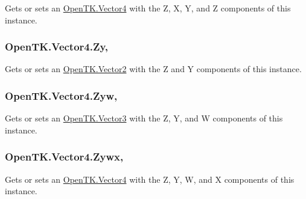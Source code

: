 Gets or sets an \hyperlink{struct_open_t_k_1_1_vector4}{Open\-T\-K.\-Vector4} with the Z, X, Y, and Z components of this instance. 

\hypertarget{struct_open_t_k_1_1_vector4_a6b251d1aabb60d339aca57817dfcf45e}{
\subsubsection[{Zy}]{ Open\-T\-K.\-Vector4.\-Zy\hspace{0.3cm}{\ttfamily [get]}, {\ttfamily [set]}}}\label{struct_open_t_k_1_1_vector4_a6b251d1aabb60d339aca57817dfcf45e}


Gets or sets an \hyperlink{struct_open_t_k_1_1_vector2}{Open\-T\-K.\-Vector2} with the Z and Y components of this instance. 

\hypertarget{struct_open_t_k_1_1_vector4_a9594de4b64544f1387b8dd76f7568936}{
\subsubsection[{Zyw}]{ Open\-T\-K.\-Vector4.\-Zyw\hspace{0.3cm}{\ttfamily [get]}, {\ttfamily [set]}}}\label{struct_open_t_k_1_1_vector4_a9594de4b64544f1387b8dd76f7568936}


Gets or sets an \hyperlink{struct_open_t_k_1_1_vector3}{Open\-T\-K.\-Vector3} with the Z, Y, and W components of this instance. 

\hypertarget{struct_open_t_k_1_1_vector4_a0c074234218bea5d90fd5e1a86e6d35b}{
\subsubsection[{Zywx}]{ Open\-T\-K.\-Vector4.\-Zywx\hspace{0.3cm}{\ttfamily [get]}, {\ttfamily [set]}}}\label{struct_open_t_k_1_1_vector4_a0c074234218bea5d90fd5e1a86e6d35b}


Gets or sets an \hyperlink{struct_open_t_k_1_1_vector4}{Open\-T\-K.\-Vector4} with the Z, Y, W, and X components of this instance. 

